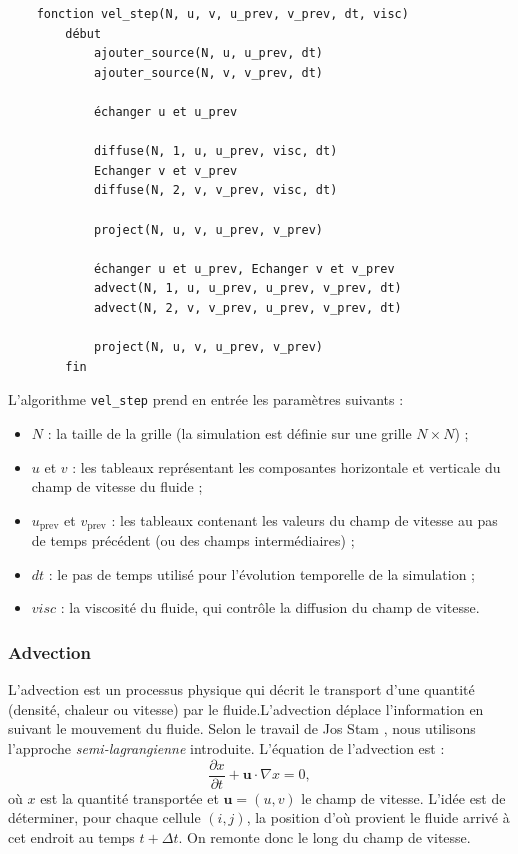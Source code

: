 \documentclass[a4paper]{article}
\begin{document}
\begin{verbatim}
    fonction vel_step(N, u, v, u_prev, v_prev, dt, visc)
        début
            ajouter_source(N, u, u_prev, dt)
            ajouter_source(N, v, v_prev, dt)

            échanger u et u_prev

            diffuse(N, 1, u, u_prev, visc, dt)
            Echanger v et v_prev
            diffuse(N, 2, v, v_prev, visc, dt)

            project(N, u, v, u_prev, v_prev)

            échanger u et u_prev, Echanger v et v_prev
            advect(N, 1, u, u_prev, u_prev, v_prev, dt)
            advect(N, 2, v, v_prev, u_prev, v_prev, dt)

            project(N, u, v, u_prev, v_prev)
        fin
\end{verbatim}


L'algorithme \texttt{vel\_step} prend en entrée les paramètres suivants :
\begin{itemize}
    \item $N$ : la taille de la grille (la simulation est définie sur une grille $N \times N$) ;
    \item $u$ et $v$ : les tableaux représentant les composantes horizontale et verticale du champ de vitesse du fluide ;
    \item $u_{\text{prev}}$ et $v_{\text{prev}}$ : les tableaux contenant les valeurs du champ de vitesse au pas de temps précédent (ou des champs intermédiaires) ;
    \item $dt$ : le pas de temps utilisé pour l'évolution temporelle de la simulation ;
    \item $visc$ : la viscosité du fluide, qui contrôle la diffusion du champ de vitesse.
\end{itemize}


\subsubsection{Advection}

\hspace*{\parindent} L'advection est un processus physique qui décrit le transport d'une quantité (densité, chaleur ou vitesse) par 
le fluide.L'advection déplace l'information en suivant le mouvement du fluide. Selon le travail de Jos Stam 
\cite{Stam99}, nous utilisons l'approche \emph{semi-lagrangienne} introduite. L'équation de l'advection est  :
\[
    \frac{\partial x}{\partial t} + \mathbf{u} \cdot \nabla x = 0,
\]
où $x$ est la quantité transportée et $\mathbf{u} = (u,v)$ le champ de vitesse. 
L'idée est de déterminer, pour chaque cellule $(i,j)$, la position d'où provient le fluide arrivé à cet
 endroit au temps $t + \Delta t$. On remonte donc le long du champ de vitesse.
\end{document}
